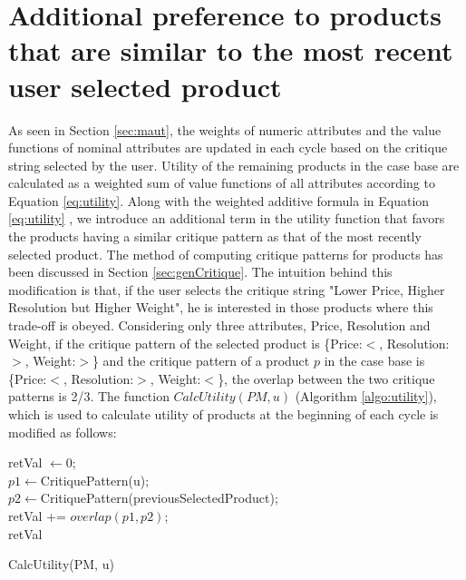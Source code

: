 \section{Additional preference to products that are similar to the most recent user selected product}
\label{sec:addTerm}
As seen in Section \ref{sec:maut}, the weights of numeric attributes and the value functions of nominal attributes are updated in each cycle based on the critique string selected by the user.
Utility of the remaining products in the case base are calculated as a weighted sum of value functions of all attributes according to Equation \ref{eq:utility}.
Along with the weighted additive formula in Equation \ref{eq:utility} , we introduce an additional term in the utility function that favors the products having a similar critique pattern as that of the most recently selected product.
The method of computing critique patterns for products has been discussed in Section \ref{sec:genCritique}.
The intuition behind this modification is that, if the user selects the critique string "Lower Price, Higher Resolution but Higher Weight", he is interested in those products where this trade-off is obeyed.
Considering only three attributes, Price, Resolution and Weight, if the critique pattern of the selected product is \{Price:$<$, Resolution:$>$, Weight:$>$\} and the critique pattern of a product $p$ in the case base is \{Price:$<$, Resolution:$>$, Weight:$<$\}, the overlap between the two critique patterns is 2/3.
The function $CalcUtility(PM, u)$ (Algorithm \ref{algo:utility}), which is used to calculate utility of products at the beginning of each cycle is modified as follows:

\begin{algorithm}[ht]
  \DontPrintSemicolon

  retVal $\gets 0$;\\
  $p1 \gets $CritiquePattern(u);\\
  $p2 \gets $CritiquePattern(previousSelectedProduct);\\
  retVal += $overlap(p1, p2)$;\\
  \Return retVal
  \caption{CalcUtility(PM, u)}
  \label{algo:addPref}
\end{algorithm}




